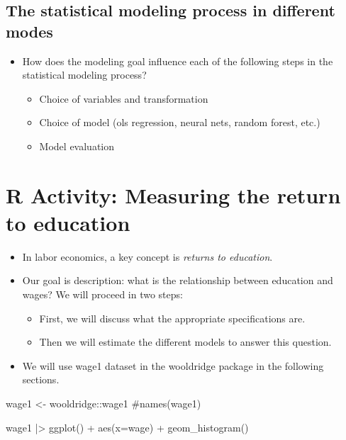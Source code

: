 \documentclass[
  letterpaper,
  DIV=11,
  numbers=noendperiod]{scrreprt}
\newenvironment{Shaded}{\begin{snugshade}}{\end{snugshade}}
\newcommand{\AttributeTok}[1]{\textcolor[rgb]{0.40,0.45,0.13}{#1}}
\newcommand{\CommentTok}[1]{\textcolor[rgb]{0.37,0.37,0.37}{#1}}
\newcommand{\FunctionTok}[1]{\textcolor[rgb]{0.28,0.35,0.67}{#1}}
\newcommand{\NormalTok}[1]{\textcolor[rgb]{0.00,0.23,0.31}{#1}}
\newcommand{\OtherTok}[1]{\textcolor[rgb]{0.00,0.23,0.31}{#1}}
\newcommand{\SpecialCharTok}[1]{\textcolor[rgb]{0.37,0.37,0.37}{#1}}
\providecommand{\tightlist}{%
  \setlength{\itemsep}{0pt}\setlength{\parskip}{0pt}}\usepackage{longtable,booktabs,array}
\begin{document}
\subsection{The statistical modeling process in different
modes}\label{the-statistical-modeling-process-in-different-modes}

\begin{itemize}
\item
  How does the modeling goal influence each of the following steps in
  the statistical modeling process?

  \begin{itemize}
  \item
    Choice of variables and transformation
  \item
    Choice of model (ols regression, neural nets, random forest, etc.)
  \item
    Model evaluation
  \end{itemize}
\end{itemize}

\section{R Activity: Measuring the return to
education}\label{r-activity-measuring-the-return-to-education}

\begin{itemize}
\tightlist
\item
  In labor economics, a key concept is \emph{returns to education}.\\
\item
  Our goal is description: what is the relationship between education
  and wages? We will proceed in two steps:

  \begin{itemize}
  \tightlist
  \item
    First, we will discuss what the appropriate specifications are.
  \item
    Then we will estimate the different models to answer this question.
  \end{itemize}
\item
  We will use wage1 dataset in the wooldridge package in the following
  sections.
\end{itemize}

\begin{Shaded}
\begin{Highlighting}[]
\NormalTok{wage1 }\OtherTok{\textless{}{-}}\NormalTok{ wooldridge}\SpecialCharTok{::}\NormalTok{wage1}
\CommentTok{\#names(wage1)}

\NormalTok{wage1 }\SpecialCharTok{|\textgreater{}} 
  \FunctionTok{ggplot}\NormalTok{() }\SpecialCharTok{+} 
  \FunctionTok{aes}\NormalTok{(}\AttributeTok{x=}\NormalTok{wage) }\SpecialCharTok{+} 
  \FunctionTok{geom\_histogram}\NormalTok{()}
\end{Highlighting}
\end{Shaded}
\end{document}
